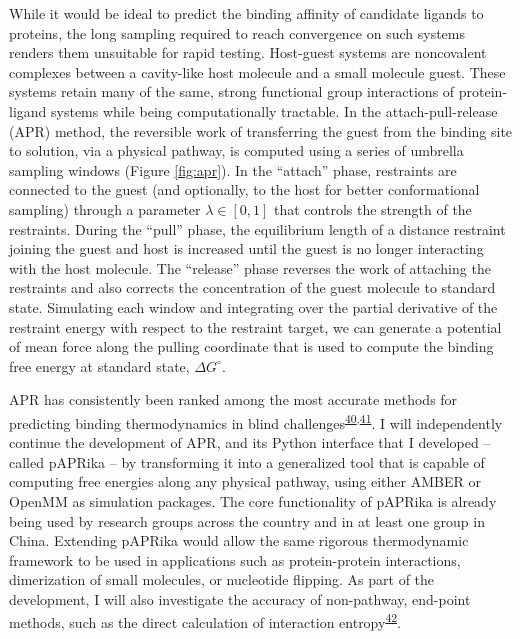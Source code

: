 \documentclass[11pt,notitlepage]{article}
\begin{document}
While it would be ideal to predict the binding affinity of candidate
ligands to proteins, the long sampling required to reach convergence on
such systems renders them unsuitable for rapid testing. Host-guest
systems are noncovalent complexes between a cavity-like host molecule
and a small molecule guest. These systems retain many of the same,
strong functional group interactions of protein-ligand systems while
being computationally tractable. In the attach-pull-release (APR)
method, the reversible work of transferring the guest from the binding
site to solution, via a physical pathway, is computed using a series of
umbrella sampling windows (Figure \ref{fig:apr}). In the ``attach''
phase, restraints are connected to the guest (and optionally, to the
host for better conformational sampling) through a parameter
\(\lambda \in [0, 1]\) that controls the strength of the restraints.
During the ``pull'' phase, the equilibrium length of a distance
restraint joining the guest and host is increased until the guest is no
longer interacting with the host molecule. The ``release'' phase
reverses the work of attaching the restraints and also corrects the
concentration of the guest molecule to standard state. Simulating each
window and integrating over the partial derivative of the restraint
energy with respect to the restraint target, we can generate a potential
of mean force along the pulling coordinate that is used to compute the
binding free energy at standard state, \(\Delta G^\circ\).

APR has consistently been ranked among the most accurate methods for
predicting binding thermodynamics in blind
challenges\textsuperscript{\protect\hyperlink{ref-BGsUYQln}{40},\protect\hyperlink{ref-GA1AFcUw}{41}}.
I will independently continue the development of APR, and its Python
interface that I developed -- called pAPRika -- by transforming it into
a generalized tool that is capable of computing free energies along any
physical pathway, using either AMBER or OpenMM as simulation packages.
The core functionality of pAPRika is already being used by research
groups across the country and in at least one group in China. Extending
pAPRika would allow the same rigorous thermodynamic framework to be used
in applications such as protein-protein interactions, dimerization of
small molecules, or nucleotide flipping. As part of the development, I
will also investigate the accuracy of non-pathway, end-point methods,
such as the direct calculation of interaction
entropy\textsuperscript{\protect\hyperlink{ref-gRfhPG7N}{42}}.
\end{document}
